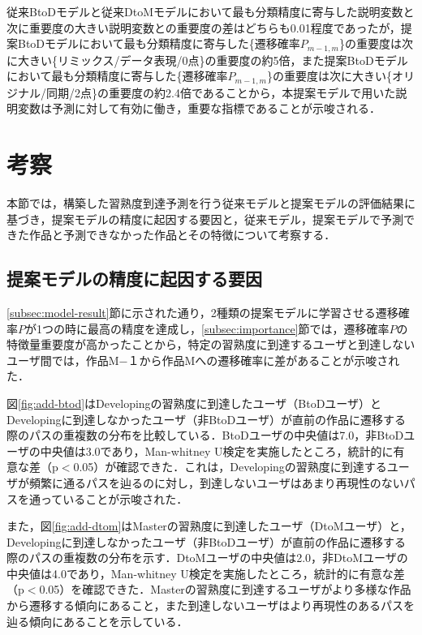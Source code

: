 \documentclass[submit,ses,noauthor]{ipsj}
\begin{document}
従来BtoDモデルと従来DtoMモデルにおいて最も分類精度に寄与した説明変数と次に重要度の大きい説明変数との重要度の差はどちらも0.01程度であったが，提案BtoDモデルにおいて最も分類精度に寄与した\{遷移確率$P_{m-1,m}$\}の重要度は次に大きい\{リミックス/データ表現/0点\}の重要度の約5倍，また提案BtoDモデルにおいて最も分類精度に寄与した\{遷移確率$P_{m-1,m}$\}の重要度は次に大きい\{オリジナル/同期/2点\}の重要度の約2.4倍であることから，本提案モデルで用いた説明変数は予測に対して有効に働き，重要な指標であることが示唆される．


\section{考察}

本節では，構築した習熟度到達予測を行う従来モデルと提案モデルの評価結果に基づき，提案モデルの精度に起因する要因と，従来モデル，提案モデルで予測できた作品と予測できなかった作品とその特徴について考察する．

\subsection{提案モデルの精度に起因する要因}

\ref{subsec:model-result}節に示された通り，2種類の提案モデルに学習させる遷移確率$P$が1つの時に最高の精度を達成し，\ref{subsec:importance}節では，遷移確率$P$の特徴量重要度が高かったことから，特定の習熟度に到達するユーザと到達しないユーザ間では，作品M−１から作品Mへの遷移確率に差があることが示唆された．

図\ref{fig:add-btod}はDevelopingの習熟度に到達したユーザ（BtoDユーザ）とDevelopingに到達しなかったユーザ（非BtoDユーザ）が直前の作品に遷移する際のパスの重複数の分布を比較している．BtoDユーザの中央値は7.0，非BtoDユーザの中央値は3.0であり，Man-whitney U検定を実施したところ，統計的に有意な差（p$<$0.05）が確認できた．これは，Developingの習熟度に到達するユーザが頻繁に通るパスを辿るのに対し，到達しないユーザはあまり再現性のないパスを通っていることが示唆された．

また，図\ref{fig:add-dtom}はMasterの習熟度に到達したユーザ（DtoMユーザ）と，Developingに到達しなかったユーザ（非BtoDユーザ）が直前の作品に遷移する際のパスの重複数の分布を示す．DtoMユーザの中央値は2.0，非DtoMユーザの中央値は4.0であり，Man-whitney U検定を実施したところ，統計的に有意な差（p$<$0.05）を確認できた．Masterの習熟度に到達するユーザがより多様な作品から遷移する傾向にあること，また到達しないユーザはより再現性のあるパスを辿る傾向にあることを示している．
\end{document}
